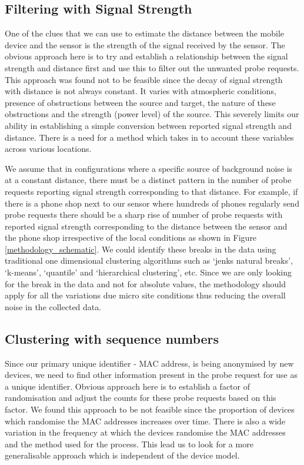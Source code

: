 \subsection{Filtering with Signal Strength} 

One of the clues that we can use to estimate the distance between the mobile
device and the sensor is the strength of the signal received by the sensor. The
obvious approach here is to try and establish a relationship between the signal
strength and distance first and use this to filter out the unwanted probe
requests. This approach was found not to be feasible since the decay of signal
strength with distance is not always constant. It varies with atmospheric
conditions, presence of obstructions between the source and target, the nature
of these obstructions and the strength (power level) of the source. This
severely limits our ability in establishing a simple conversion between reported
signal strength and distance. There is a need for a method which takes in to
account these variables across various locations.

We assume that in configurations where a specific source of background
noise is at a constant distance, there must be a distinct pattern in the number
of probe requests reporting signal strength corresponding to that distance. For
example, if there is a phone shop next to our sensor where hundreds of phones
regularly send probe requests there should be a sharp rise of number of probe
requests with reported signal strength corresponding to the distance between the
sensor and the phone shop irrespective of the local conditions as shown in
Figure \ref{methodology_schematic}. We could identify these breaks in the data
using traditional one dimensional clustering algorithms such as `jenks natural
breaks', `k-means', `quantile' and `hierarchical clustering', etc. Since we are
only looking for the break in the data and not for absolute values, the
methodology should apply for all the variations due micro site conditions thus
reducing the overall noise in the collected data.

\subsection{Clustering with sequence numbers}

Since our primary unique identifier - MAC address, is being anonymised by new
devices, we need to find other information present in the probe request for use
as a unique identifier. Obvious approach here is to establish a factor of
randomisation and adjust the counts for these probe requests based on this
factor. We found this approach to be not feasible since the proportion of
devices which randomise the MAC addresses increases over time. There is also a
wide variation in the frequency at which the devices randomise the MAC addresses
and the method used for the process. This lead us to look for a more
generalisable approach which is independent of the device model.

